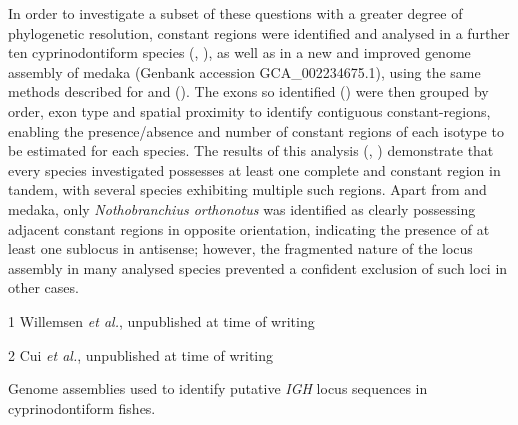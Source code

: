 In order to investigate a subset of these questions with a greater degree of phylogenetic resolution, \igh{} constant regions were identified and analysed in a further ten cyprinodontiform species (, ), as well as in a new and improved genome assembly of medaka (Genbank accession GCA\_002234675.1), using the same methods described for \Nfu and \Xma (). The exons so identified () were then grouped by order, exon type and spatial proximity to identify contiguous constant-regions, enabling the presence/absence and number of constant regions of each isotype to be estimated for each species. %
The results of this analysis (, ) demonstrate that every species investigated possesses at least one complete  and  constant region in tandem, with several species exhibiting multiple such regions. Apart from \Nfu and medaka, only \textit{Nothobranchius orthonotus} was identified as clearly possessing adjacent constant regions in opposite orientation, indicating the presence of at least one sublocus in antisense; however, the fragmented nature of the \igh{} locus assembly in many analysed species prevented a confident exclusion of such loci in other cases.


\begin{table}[bh!]
\centering
\begin{threeparttable}

\begin{tablenotes}
\item[1] Willemsen \textit{et al.}, unpublished at time of writing
\item[2] Cui \textit{et al.}, unpublished at time of writing
\end{tablenotes} %
\end{threeparttable}
\vspace{0.5em}
\caption{Genome assemblies used to identify putative \textit{IGH} locus sequences in cyprinodontiform fishes.}
\label{tab:cyprinodontiform-genomes}
\end{table}

